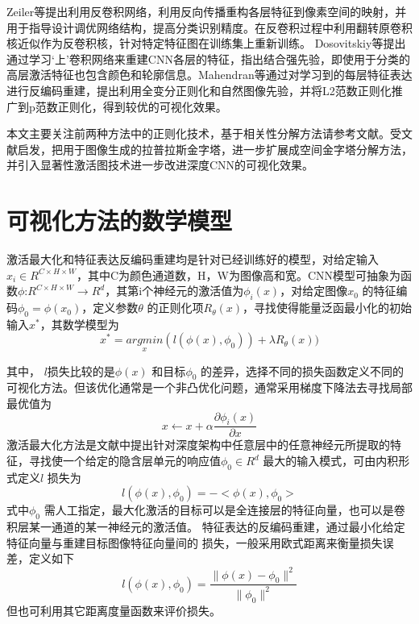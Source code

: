 Zeiler等\citep{Zeiler2014}提出利用反卷积网络，利用反向传播重构各层特征到像素空间的映射，并用于指导设计调优网络结构，提高分类识别精度。在反卷积过程中利用翻转原卷积核近似作为反卷积核，针对特定特征图在训练集上重新训练。
Dosovitskiy等\citep{Brox}提出通过学习‘上’卷积网络来重建CNN各层的特征，指出结合强先验，即使用于分类的高层激活特征也包含颜色和轮廓信息。Mahendran等\citep{Mahendran2015d,Mahendran2015}通过对学习到的每层特征表达进行反编码重建，提出利用全变分正则化和自然图像先验，并将L2范数正则化推广到p范数正则化，得到较优的可视化效果。


本文主要关注前两种方法中的正则化技术，基于相关性分解方法请参考文献。受文献\citep{Huang2017c,Denton2015}启发，把用于图像生成的拉普拉斯金字塔，进一步扩展成空间金字塔分解方法，并引入显著性激活图技术进一步改进深度CNN的可视化效果。
\section{可视化方法的数学模型}

激活最大化和特征表达反编码重建均是针对已经训练好的模型，对给定输入$x_{i}\in R^{C\times H\times W}$，其中C为颜色通道数，H，W为图像高和宽。CNN模型可抽象为函数$\phi$:$R^{C\times H\times W}\rightarrow R^d$，其第i个神经元的激活值为$\phi _{i}(x)$，对给定图像$x_{0}$ 的特征编码$\phi _{0}=\phi (x_{0})$，定义参数$\theta$ 的正则化项$R_{\theta}(x)$，寻找使得能量泛函最小化的初始输入$x^*$，其数学模型为
\begin{equation} 
\label{eq:ch04_01}
     x^*=\underset{x}{argmin} (l(\phi (x),\phi _{0})) + \lambda R_\theta(x))
\end{equation}

其中， $l$损失比较的是$\phi (x)$ 和目标$\phi_{0}$ 的差异，选择不同的损失函数定义不同的可视化方法。但该优化通常是一个非凸优化问题，通常采用梯度下降法去寻找局部最优值为
\begin{equation}
\label{eq:ch04_02}
     x \leftarrow x+ \alpha \frac{\partial \phi _{i}(x)}{\partial x}
\end{equation}
激活最大化方法是文献中提出针对深度架构中任意层中的任意神经元所提取的特征，寻找使一个给定的隐含层单元的响应值$\phi _{0}\in R^d$ 最大的输入模式，可由内积形式定义$l$ 损失为
\begin{equation} 
\label{eq:ch04_03}
     l(\phi (x),\phi_{0}) =-<\phi (x),\phi _{0}>
\end{equation}
  式中$\phi_{0}$ 需人工指定，最大化激活的目标可以是全连接层的特征向量，也可以是卷积层某一通道的某一神经元的激活值。
特征表达的反编码重建，通过最小化给定特征向量与重建目标图像特征向量间的 损失，一般采用欧式距离来衡量损失误差，定义如下 
\begin{equation} \label{eq:ch04_04}
     l(\phi (x),\phi _{0}) = \frac{\parallel\phi (x)-\phi _{0} \parallel^2 }{\parallel \phi _{0} \parallel^2 }
\end{equation} 
但也可利用其它距离度量函数来评价损失。

